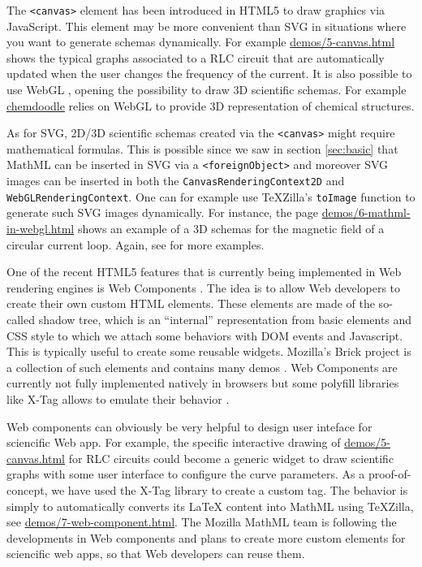 The {\tt <canvas>} element has been introduced in HTML5 to draw graphics via
JavaScript. This element may be more convenient than SVG in situations where
you want to generate schemas dynamically. For example \href{http://fred-wang.github.io/MathUI2014/demos/5-canvas.html}{demos/5-canvas.html}
shows the typical graphs associated to a RLC circuit that are automatically
updated when the user changes the frequency of the current. It is also possible
to use WebGL \cite{WebGLspec},
opening the possibility to draw 3D scientific schemas. For example
\href{http://www.chemdoodle.com/}{chemdoodle}
relies on WebGL to provide 3D representation of chemical structures.

As for SVG, 2D/3D scientific schemas created via the {\tt <canvas>} might
require mathematical formulas. This is possible since we saw in section
\ref{sec:basic} that MathML can be
inserted in SVG via a {\tt <foreignObject>} and moreover SVG images can be
inserted in both the {\tt CanvasRenderingContext2D} and
{\tt WebGLRenderingContext}. One
can for example use TeXZilla's {\tt toImage} function to generate such SVG
images dynamically. For instance,
the page \href{http://fred-wang.github.io/MathUI2014/demos/6-mathml-in-webgl.html}{demos/6-mathml-in-webgl.html} shows an
example of a 3D schemas for the magnetic field of a circular current loop.
Again, see \cite{MathInEbooks} for more examples.

One of the recent HTML5 features that is currently being implemented in Web
rendering engines is Web Components \cite{WebComponents}.
The idea is to allow Web developers to
create their own custom HTML elements. These elements are made of the so-called
shadow tree, which is an ``internal'' representation from basic elements and CSS
style to which we attach some behaviors with DOM events and Javascript. This is
typically useful to create some reusable widgets. Mozilla's Brick project
is a collection of such elements and contains many demos \cite{Brick}.
Web Components are currently
not fully implemented natively in browsers but some polyfill libraries like
X-Tag allows to emulate their behavior \cite{XTag}.

Web components can obviously be very helpful to design user inteface for
sciencific Web app. For example, the specific interactive drawing of
\href{http://fred-wang.github.io/MathUI2014/demos/5-canvas.html}{demos/5-canvas.html} for RLC circuits could become a generic widget 
{\tt <x-graph>} to draw scientific graphs with some user interface to
configure the curve parameters. As a proof-of-concept, we have used the X-Tag
library to create a custom {\tt <x-tex>} tag. The behavior is simply to
automatically converts its LaTeX content into MathML using TeXZilla, see
\href{http://fred-wang.github.io/MathUI2014/demos/7-web-component.html}{demos/7-web-component.html}.
The Mozilla MathML team is following the developments in Web components and
plans to create more custom elements for sciencific web apps, so that Web
developers can reuse them.
